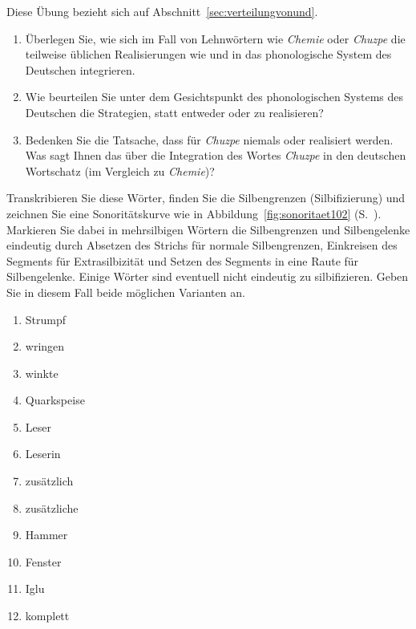  \label{exc:phonologie03} Diese Übung bezieht sich auf Abschnitt~\ref{sec:verteilungvonund}.

\begin{enumerate}
  \item Überlegen Sie, wie sich im Fall von Lehnwörtern wie \textit{Chemie} oder \textit{Chuzpe} die teilweise üblichen Realisierungen wie \textipa{[\c{c}emi:]} und \textipa{[XU\t{ts}p@]} in das phonologische System des Deutschen integrieren.
  \item Wie beurteilen Sie unter dem Gesichtspunkt des phonologischen Systems des Deutschen die Strategien, statt \textipa{[\c{c}emi:]} entweder \textipa{[Semi:]} oder \textipa{[kemi:]} zu realisieren?
  \item Bedenken Sie die Tatsache, dass für \textit{Chuzpe} niemals \textipa{[SU\t{ts}p@]} oder \textipa{[kU\t{ts}p@]} realisiert werden.
    Was sagt Ihnen das über die Integration des Wortes \textit{Chuzpe} in den deutschen Wortschatz (im Vergleich zu \textit{Chemie})?
\end{enumerate}

 \label{exc:phonologie04} Transkribieren Sie diese Wörter, finden Sie die Silbengrenzen (Silbifizierung) und zeichnen Sie eine Sonoritätskurve wie in Abbildung~\ref{fig:sonoritaet102} (S.~\pageref{fig:sonoritaet102}).
Markieren Sie dabei in mehrsilbigen Wörtern die Silbengrenzen und Silbengelenke eindeutig durch Absetzen des Strichs für normale Silbengrenzen, Einkreisen des Segments für Extrasilbizität und Setzen des Segments in eine Raute für Silbengelenke.
Einige Wörter sind eventuell nicht eindeutig zu silbifizieren.
Geben Sie in diesem Fall beide möglichen Varianten an.

\begin{enumerate}
  \item Strumpf
  \item wringen
  \item winkte
  \item Quarkspeise
  \item Leser
  \item Leserin
  \item zusätzlich
  \item zusätzliche
  \item Hammer
  \item Fenster
  \item Iglu
  \item komplett
\end{enumerate}


